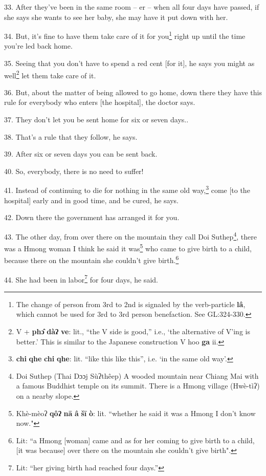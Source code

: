 33. After they've been in the same room -- er -- when all four days have passed,
if she says she wants to see her baby, she may have it put down with her.

34. But, it's fine to have them take care of it for you\footnote{The change of person from 3rd to 2nd is signaled by the verb-particle \textbf{lâ}, which cannot be used for 3rd to 3rd person benefaction. See GL:324-330.} right up until the
time you're led back home.

35. Seeing that you don't have to spend a red cent [for it], he says you might
as well\footnote{V + \textbf{phɔ̂} \textbf{dàʔ} \textbf{ve}: lit., ``the V side is good,'' i.e., `the alternative of V'ing is better.' This is similar to the Japanese construction V hoo \textbf{ga} ii.} let them take care of it.

36. But, about the matter of being allowed to go home, down there they have this
rule for everybody who enters [the hospital], the doctor says.

37. They don't let you be sent home for six or seven days..

38. That's a rule that they follow, he says.

39. After six or seven days you can be sent back.

40. So, everybody, there is no need to suffer!

41. Instead of continuing to die for nothing in the same old way,\footnote{\textbf{chi} \textbf{qhe} \textbf{chi} \textbf{qhe}: lit. ``like this like this'', i.e. `in the same old way'.} come [to
the hospital] early and in good time, and be cured, he says.

42. Down there the government has arranged it for you.

43. The other day, from over there on the mountain they call Doi Suthep\footnote{Doi Suthep (Thai Dɔɔj Sùʔthêep) A wooded mountain near Chiang Mai with a famous Buddhist temple on its summit. There is a Hmong village (Hwè-tìʔ) on a nearby slope.}, there
was a Hmong woman I think he said it was\footnote{Khè-mèoʔ \textbf{qôʔ} \textbf{nā} \textbf{â} \textbf{šī} \textbf{ò}: lit. ``whether he said it was a Hmong I don't know now."} who came to give birth to a child,
because there on the mountain she couldn't give birth.\footnote{Lit: ``a Hmong [woman] came and as for her coming to give birth to a child, [it was because] over there on the mountain she couldn't give birth".}

44. She had been in labor\footnote{Lit: ``her giving birth had reached four days.''} for four days, he said.

